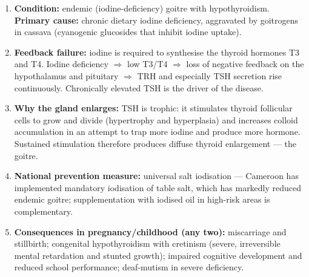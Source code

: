 \documentclass[11pt]{article}
\begin{document}
\begin{corrige}
\begin{enumerate}
\item \textbf{Condition:} endemic (iodine-deficiency) goitre with hypothyroidism. \textbf{Primary cause:} chronic dietary iodine deficiency, aggravated by goitrogens in cassava (cyanogenic glucosides that inhibit iodine uptake).
\item \textbf{Feedback failure:} iodine is required to synthesise the thyroid hormones T3 and T4. Iodine deficiency $\Rightarrow$ low T3/T4 $\Rightarrow$ loss of negative feedback on the hypothalamus and pituitary $\Rightarrow$ TRH and especially TSH secretion rise continuously. Chronically elevated TSH is the driver of the disease.
\item \textbf{Why the gland enlarges:} TSH is trophic: it stimulates thyroid follicular cells to grow and divide (hypertrophy and hyperplasia) and increases colloid accumulation in an attempt to trap more iodine and produce more hormone. Sustained stimulation therefore produces diffuse thyroid enlargement — the goitre.
\item \textbf{National prevention measure:} universal salt iodisation — Cameroon has implemented mandatory iodisation of table salt, which has markedly reduced endemic goitre; supplementation with iodised oil in high-risk areas is complementary.
\item \textbf{Consequences in pregnancy/childhood (any two):} miscarriage and stillbirth; congenital hypothyroidism with cretinism (severe, irreversible mental retardation and stunted growth); impaired cognitive development and reduced school performance; deaf-mutism in severe deficiency.
\end{enumerate}
\end{corrige}
\end{document}

